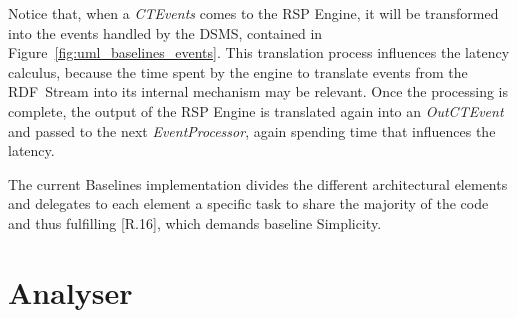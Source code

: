 Notice that, when a \textit{CTEvents} comes to the RSP Engine, it will be transformed into the events handled by the DSMS, contained in Figure~\ref{fig:uml_baselines_events}. This translation process influences the latency calculus, because the time spent by the engine to translate events from the RDF~Stream into its internal mechanism may be relevant. Once the processing is complete, the output of the RSP Engine is translated again into an \textit{OutCTEvent} and passed to the next \textit{EventProcessor}, again spending time that influences the latency.

The current Baselines implementation divides the different architectural elements and delegates to each element a specific task to share the majority of the code and thus fulfilling [R.16], which demands baseline Simplicity.

%

\section{Analyser}\label{sec:analyser-impl}

